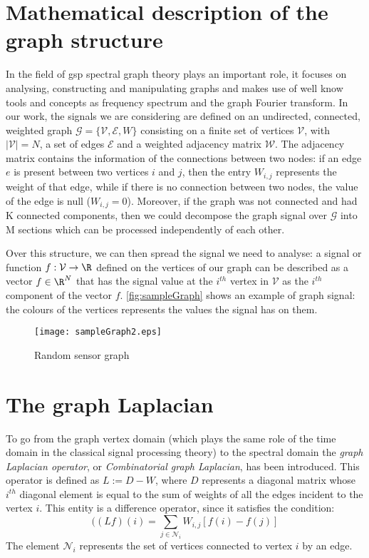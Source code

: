 \section{Mathematical description of the graph structure}
In the field of \gls{gsp} spectral graph theory plays an important role, it focuses on analysing, constructing and manipulating graphs and makes use of well know tools and concepts as frequency spectrum and the graph Fourier transform. In our work, the signals we are considering are defined on an undirected, connected, weighted graph $\mathcal{G} = \{ \mathcal{V}, \mathcal{E}, W\}$ consisting on a finite set of vertices $\mathcal{V}$, with $|\mathcal{V}| = N$, a set of edges $\mathcal{E}$ and a weighted adjacency matrix $\mathcal{W}$. The adjacency matrix contains the information of the connections between two nodes: if an edge $e$ is present between two vertices $i$ and $j$, then the entry $W_{i,j}$ represents the weight of that edge, while if there is no connection between two nodes, the value of the edge is null ($W_{i,j} = 0$). Moreover, if the graph was not connected and had K connected components, then we could decompose the graph signal over $\mathcal{G}$ into M sections which can be processed independently of each other.

Over this structure, we can then spread the signal we need to analyse: a signal or function $f: \mathcal{V} \to \R$ defined on the vertices of our graph can be described as a vector $f \in \R^N$ that has the signal value at the $i^{th}$ vertex in $\mathcal{V}$ as the $i^{th}$ component of the vector $f$. \autoref{fig:sampleGraph} shows an example of graph signal: the colours of the vertices represents the values the signal has on them.

\begin{figure}[tb]
  \centering
  \texttt{[image: sampleGraph2.eps]}
  \caption{Random sensor graph}
  \label{fig:sampleGraph}
\end{figure}


\section{The graph Laplacian}
\label{sec:graph laplacian}
To go from the graph vertex domain (which plays the same role of the time domain in the classical signal processing theory) to the spectral domain the \textit{graph Laplacian operator}, or \textit{Combinatorial graph Laplacian}, has been introduced. This operator is defined as $L := D - W$, where $D$ represents a diagonal matrix whose  $i^{th}$ diagonal element is equal to the sum of weights of all the edges incident to the vertex $i$. This entity is a difference operator, since it satisfies the condition:
\begin{equation}
((L f)(i) = \sum_{j \in \mathcal{N}_i} W_{i,j}[f(i) - f(j)]
\end{equation}
The element $\mathcal{N}_i$ represents the set of vertices connected to vertex $i$ by an edge.

